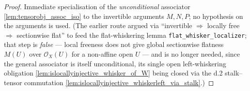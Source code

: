 \begin{proof}
  \leanok
  Immediate specialisation of the \emph{unconditional} associator
  \cref{lem:tensorobj_assoc_iso} to the invertible arguments \(M, N, P\); no
  hypothesis on the arguments is used. (The earlier route argued via ``invertible
  \(\Rightarrow\) locally free \(\Rightarrow\) sectionwise flat'' to feed the
  flat-whiskering lemma \texttt{flat\_whisker\_localizer}; that step is \emph{false}
  --- local freeness does not give global sectionwise flatness \(M(U)\) over
  \(\mathcal{O}_X(U)\) for a non-affine open \(U\) --- and is no longer needed, since
  the general associator is itself unconditional, its single open left-whiskering
  obligation \cref{lem:islocallyinjective_whisker_of_W} being closed via the d.2
  stalk--tensor commutation \cref{lem:islocallyinjective_whiskerleft_via_stalk}.)
\end{proof}

